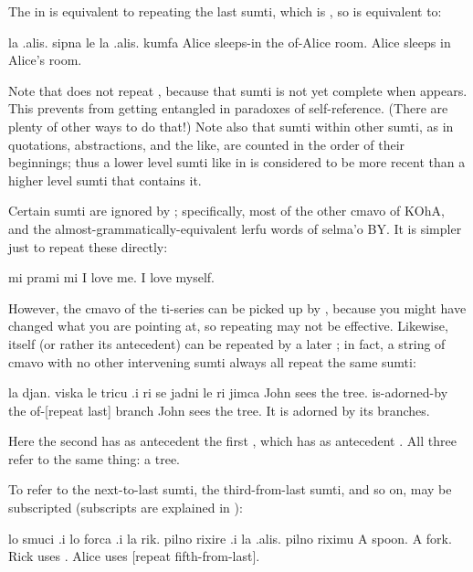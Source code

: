 The  in  is equivalent to
    repeating the last sumti, which is , so  is equivalent to:
\begin{example}
la .alis. sipna le la .alis. kumfa\n
Alice sleeps-in the of-Alice room.\n
Alice sleeps in Alice's room.
\end{example}

Note that  does not repeat , because that
    sumti is not yet complete when  appears. This prevents
     from getting entangled in paradoxes of self-reference.
    (There are plenty of other ways to do that!) Note also that
    sumti within other sumti, as in quotations, abstractions, and
    the like, are counted in the order of their beginnings; thus a
    lower level sumti like  in  is considered to be more recent than a higher level
    sumti that contains it. 

Certain sumti are ignored by ; specifically, most of
    the other cmavo of KOhA, and the
    almost-grammatically-equivalent lerfu words of selma'o BY. It
    is simpler just to repeat these directly:
\begin{example}
mi prami mi\n
I love me.\n
I love myself.
\end{example}

However, the cmavo of the ti-series can be picked up by ,
    because you might have changed what you are pointing at, so
    repeating  may not be effective. Likewise,  itself
    (or rather its antecedent) can be repeated by a later ;
    in fact, a string of  cmavo with no other intervening
    sumti always all repeat the same sumti:
\begin{example}
la djan. viska le tricu\n
\T	.i ri se jadni\n
\T	le ri jimca\n
John sees the tree.\n
\T	{} is-adorned-by\n
\T	the of-[repeat last] branch\n
John sees the tree.  It is adorned by its branches.
\end{example}

Here the second  has as antecedent the first ,
    which has as antecedent . All three refer to the
    same thing: a tree.

To refer to the next-to-last sumti, the third-from-last
    sumti, and so on,  may be subscripted (subscripts are
    explained in ):
\begin{example}
lo smuci .i lo forca .i la rik. pilno rixire\n
\T	.i la .alis. pilno riximu\n
A spoon.  A fork.  Rick uses .\n
\T	Alice uses [repeat fifth-from-last].
\end{example}

